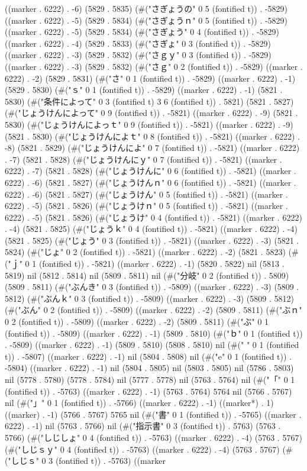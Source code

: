 {((marker . 6222) . -6) (5829 . 5835) (#("さぎょうの" 0 5 (fontified t)) . -5829) ((marker . 6222) . -5) (5829 . 5834) (#("さぎょうｎ" 0 5 (fontified t)) . -5829) ((marker . 6222) . -5) (5829 . 5834) (#("さぎょう" 0 4 (fontified t)) . -5829) ((marker . 6222) . -4) (5829 . 5833) (#("さぎょ" 0 3 (fontified t)) . -5829) ((marker . 6222) . -3) (5829 . 5832) (#("さｇｙ" 0 3 (fontified t)) . -5829) ((marker . 6222) . -3) (5829 . 5832) (#("さｇ" 0 2 (fontified t)) . -5829) ((marker . 6222) . -2) (5829 . 5831) (#("さ" 0 1 (fontified t)) . -5829) ((marker . 6222) . -1) (5829 . 5830) (#("ｓ" 0 1 (fontified t)) . -5829) ((marker . 6222) . -1) (5821 . 5830) (#("条件によって" 0 3 (fontified t) 3 6 (fontified t)) . 5821) (5821 . 5827) (#("じょうけんによって" 0 9 (fontified t)) . -5821) ((marker . 6222) . -9) (5821 . 5830) (#("じょうけんによっｔ" 0 9 (fontified t)) . -5821) ((marker . 6222) . -9) (5821 . 5830) (#("じょうけんによｔ" 0 8 (fontified t)) . -5821) ((marker . 6222) . -8) (5821 . 5829) (#("じょうけんによ" 0 7 (fontified t)) . -5821) ((marker . 6222) . -7) (5821 . 5828) (#("じょうけんにｙ" 0 7 (fontified t)) . -5821) ((marker . 6222) . -7) (5821 . 5828) (#("じょうけんに" 0 6 (fontified t)) . -5821) ((marker . 6222) . -6) (5821 . 5827) (#("じょうけんｎ" 0 6 (fontified t)) . -5821) ((marker . 6222) . -6) (5821 . 5827) (#("じょうけん" 0 5 (fontified t)) . -5821) ((marker . 6222) . -5) (5821 . 5826) (#("じょうけｎ" 0 5 (fontified t)) . -5821) ((marker . 6222) . -5) (5821 . 5826) (#("じょうけ" 0 4 (fontified t)) . -5821) ((marker . 6222) . -4) (5821 . 5825) (#("じょうｋ" 0 4 (fontified t)) . -5821) ((marker . 6222) . -4) (5821 . 5825) (#("じょう" 0 3 (fontified t)) . -5821) ((marker . 6222) . -3) (5821 . 5824) (#("じょ" 0 2 (fontified t)) . -5821) ((marker . 6222) . -2) (5821 . 5823) (#("ｊ" 0 1 (fontified t)) . -5821) ((marker . 6222) . -1) (5820 . 5822) nil (5813 . 5819) nil (5812 . 5814) nil (5809 . 5811) nil (#("分岐" 0 2 (fontified t)) . 5809) (5809 . 5811) (#("ぶんき" 0 3 (fontified t)) . -5809) ((marker . 6222) . -3) (5809 . 5812) (#("ぶんｋ" 0 3 (fontified t)) . -5809) ((marker . 6222) . -3) (5809 . 5812) (#("ぶん" 0 2 (fontified t)) . -5809) ((marker . 6222) . -2) (5809 . 5811) (#("ぶｎ" 0 2 (fontified t)) . -5809) ((marker . 6222) . -2) (5809 . 5811) (#("ぶ" 0 1 (fontified t)) . -5809) ((marker . 6222) . -1) (5809 . 5810) (#("ｂ" 0 1 (fontified t)) . -5809) ((marker . 6222) . -1) (5809 . 5810) (5808 . 5810) nil (#(" " 0 1 (fontified t)) . -5807) ((marker . 6222) . -1) nil (5804 . 5808) nil (#("e" 0 1 (fontified t)) . -5804) ((marker . 6222) . -1) nil (5804 . 5805) nil (5803 . 5805) nil (5786 . 5803) nil (5778 . 5780) (5778 . 5784) nil (5777 . 5778) nil (5763 . 5764) nil (#("「" 0 1 (fontified t)) . -5763) ((marker . 6222) . -1) (5763 . 5764) 5764 nil (5766 . 5767) nil (#("」" 0 1 (fontified t)) . -5766) ((marker . 6222) . -1) ((marker*) . 1) ((marker) . -1) (5766 . 5767) 5765 nil (#("書" 0 1 (fontified t)) . -5765) ((marker . 6222) . -1) nil (5763 . 5766) nil (#("指示書" 0 3 (fontified t)) . 5763) (5763 . 5766) (#("しじしょ" 0 4 (fontified t)) . -5763) ((marker . 6222) . -4) (5763 . 5767) (#("しじｓｙ" 0 4 (fontified t)) . -5763) ((marker . 6222) . -4) (5763 . 5767) (#("しじｓ" 0 3 (fontified t)) . -5763) ((marker }
